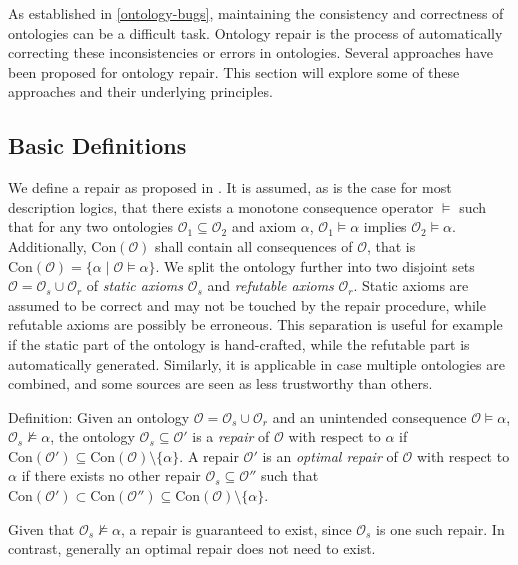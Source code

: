 
As established in \cref{ontology-bugs}, maintaining the consistency and correctness of ontologies can be a difficult task. Ontology repair is the process of automatically correcting these inconsistencies or errors in ontologies. Several approaches have been proposed for ontology repair.  This section will explore some of these approaches and their underlying principles.

\subsection{Basic Definitions} \label{basic-definitions}

We define a repair as proposed in \cite{baader2018making}. It is assumed, as is the case for most description logics, that there exists a monotone consequence operator $\vDash$ such that for any two ontologies $\mathcal{O}_1 \subseteq \mathcal{O}_2$ and axiom $\alpha$, $\mathcal{O}_1 \vDash \alpha$ implies $\mathcal{O}_2 \vDash \alpha$. Additionally, $\mathrm{Con}(\mathcal{O})$ shall contain all consequences of $\mathcal{O}$, that is $\mathrm{Con}(\mathcal{O}) = \{ \alpha \mid \mathcal{O} \vDash \alpha \}$. We split the ontology further into two disjoint sets $\mathcal{O} = \mathcal{O}_s \cup \mathcal{O}_r$ of \emph{static axioms} $\mathcal{O}_s$ and \emph{refutable axioms} $\mathcal{O}_r$. Static axioms are assumed to be correct and may not be touched by the repair procedure, while refutable axioms are possibly be erroneous. This separation is useful for example if the static part of the ontology is hand-crafted, while the refutable part is automatically generated. Similarly, it is applicable in case multiple ontologies are combined, and some sources are seen as less trustworthy than others.

Definition: Given an ontology $\mathcal{O} = \mathcal{O}_s \cup \mathcal{O}_r$ and an unintended consequence $\mathcal{O} \vDash \alpha$, $\mathcal{O}_s \not\vDash \alpha$, the ontology $\mathcal{O}_s \subseteq \mathcal{O}'$ is a \emph{repair} of $\mathcal{O}$ with respect to $\alpha$ if $\mathrm{Con}(\mathcal{O}') \subseteq \mathrm{Con}(\mathcal{O}) \setminus \{\alpha\}.$ A repair $\mathcal{O}'$ is an \emph{optimal repair} of $\mathcal{O}$ with respect to $\alpha$ if there exists no other repair $\mathcal{O}_s \subseteq \mathcal{O}''$ such that $\mathrm{Con}(\mathcal{O}') \subset \mathrm{Con}(\mathcal{O}'') \subseteq \mathrm{Con}(\mathcal{O}) \setminus \{\alpha\}$.

Given that $\mathcal{O}_s \not\vDash \alpha$, a repair is guaranteed to exist, since $\mathcal{O}_s$ is one such repair. In contrast, generally an optimal repair does not need to exist.

